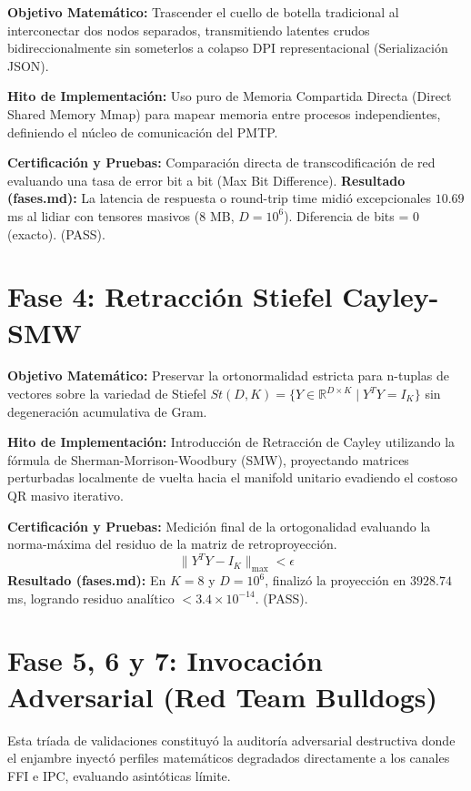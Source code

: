 \textbf{Objetivo Matemático:} Trascender el cuello de botella tradicional al interconectar dos nodos separados, transmitiendo latentes crudos bidireccionalmente sin someterlos a colapso DPI representacional (Serialización JSON).

\textbf{Hito de Implementación:} Uso puro de Memoria Compartida Directa (Direct Shared Memory Mmap) para mapear memoria entre procesos independientes, definiendo el núcleo de comunicación del PMTP.

\textbf{Certificación y Pruebas:} Comparación directa de transcodificación de red evaluando una tasa de error bit a bit (Max Bit Difference).
\textbf{Resultado (fases.md):} La latencia de respuesta o round-trip time midió excepcionales $10.69$ ms al lidiar con tensores masivos ($8$ MB, $D=10^6$). Diferencia de bits = 0 (exacto). (PASS).

\section{Fase 4: Retracción Stiefel Cayley-SMW}

\textbf{Objetivo Matemático:} Preservar la ortonormalidad estricta para n-tuplas de vectores sobre la variedad de Stiefel $St(D, K) = \{ Y \in \mathbb{R}^{D \times K} \mid Y^T Y = I_K \}$ sin degeneración acumulativa de Gram.

\textbf{Hito de Implementación:} Introducción de Retracción de Cayley utilizando la fórmula de Sherman-Morrison-Woodbury (SMW), proyectando matrices perturbadas localmente de vuelta hacia el manifold unitario evadiendo el costoso QR masivo iterativo.

\textbf{Certificación y Pruebas:} Medición final de la ortogonalidad evaluando la norma-máxima del residuo de la matriz de retroproyección.
\begin{equation}
\lVert Y^T Y - I_K \rVert_{\max} < \epsilon
\end{equation}
\textbf{Resultado (fases.md):} En $K=8$ y $D=10^6$, finalizó la proyección en $3928.74$ ms, logrando residuo analítico $< 3.4 \times 10^{-14}$. (PASS).

\section{Fase 5, 6 y 7: Invocación Adversarial (Red Team Bulldogs)}

Esta tríada de validaciones constituyó la auditoría adversarial destructiva donde el enjambre inyectó perfiles matemáticos degradados directamente a los canales FFI e IPC, evaluando asintóticas límite.


